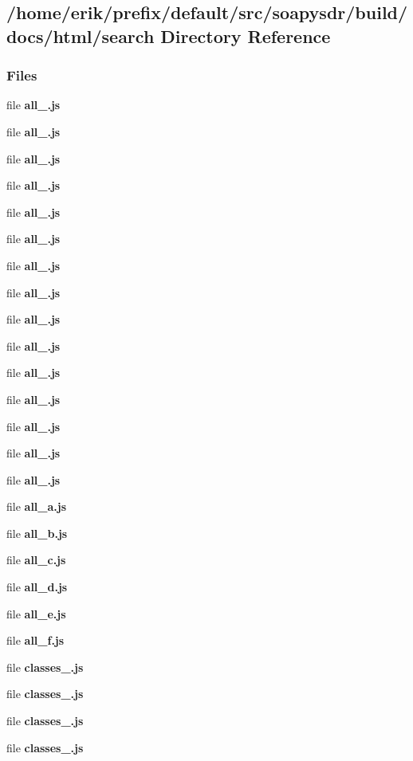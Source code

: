 \subsection{/home/erik/prefix/default/src/soapysdr/build/docs/html/search Directory Reference}
\label{dir_0d97ee07a0329d9ce3819228ffa3fe78}
\subsubsection*{Files}
\begin{DoxyCompactItemize}
\item 
file {\bf all\+\_.\+js}
\item 
file {\bf all\+\_.\+js}
\item 
file {\bf all\+\_.\+js}
\item 
file {\bf all\+\_.\+js}
\item 
file {\bf all\+\_.\+js}
\item 
file {\bf all\+\_.\+js}
\item 
file {\bf all\+\_.\+js}
\item 
file {\bf all\+\_.\+js}
\item 
file {\bf all\+\_.\+js}
\item 
file {\bf all\+\_.\+js}
\item 
file {\bf all\+\_.\+js}
\item 
file {\bf all\+\_.\+js}
\item 
file {\bf all\+\_.\+js}
\item 
file {\bf all\+\_.\+js}
\item 
file {\bf all\+\_.\+js}
\item 
file {\bf all\+\_\+a.\+js}
\item 
file {\bf all\+\_\+b.\+js}
\item 
file {\bf all\+\_\+c.\+js}
\item 
file {\bf all\+\_\+d.\+js}
\item 
file {\bf all\+\_\+e.\+js}
\item 
file {\bf all\+\_\+f.\+js}
\item 
file {\bf classes\+\_.\+js}
\item 
file {\bf classes\+\_.\+js}
\item 
file {\bf classes\+\_.\+js}
\item 
file {\bf classes\+\_.\+js}
\item 

\end{DoxyCompactItemize}
